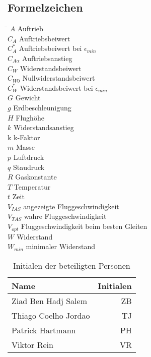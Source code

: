 \subsection*{Formelzeichen}
\begin{tabbing}
\hspace*{2cm}\=\kill
$A$ \> Auftrieb \\[0.2ex]
$C_A$ \> Auftriebsbeiwert \\[0.2ex]
$C_A^*$ \> Auftriebsbeiwert bei $\epsilon_{min}$ \\[0.2ex]
$C_{A \alpha}$ \> Auftriebsanstieg \\[0.2ex]
$C_W$ \> Widerstandsbeiwert \\[0.2ex]
$C_{W0}$ \> Nullwiderstandsbeiwert \\[0.2ex]
$C_W^*$ \> Widerstandsbeiwert bei $\epsilon_{min}$ \\[0.2ex]
$G$ \> Gewicht \\[0.2ex]
$g$ \> Erdbeschleunigung \\[0.2ex]
$H$ \> Flughöhe \\[0.2ex]
$k$ \> Widerstandsanstieg \\[0.2ex]
$\mathrm{k}$ \> k-Faktor \\[0.2ex]
$m$ \> Masse \\[0.2ex]
$p$ \> Luftdruck \\[0.2ex]
$q$ \> Staudruck \\[0.2ex]
$R$ \> Gaskonstante \\[0.2ex]
$T$ \> Temperatur \\[0.2ex]
$t$ \> Zeit \\[0.2ex]
$V_{IAS}$ \> angezeigte Fluggeschwindigkeit \\[0.2ex]
$V_{TAS}$ \> wahre Fluggeschwindigkeit \\[0.2ex]
$V_{opt}$ \> Fluggeschwindigkeit beim besten Gleiten \\[0.2ex]
$W$ \> Widerstand \\[0.2ex]
$W_{min}$ \> minimaler Widerstand \\[0.2ex]
\end{tabbing}


\begin{table}[h] 
	\centering 
	\begin{tabular}{lr} 
		
		Name & \hspace{0.5cm} Initialen\\ 
		\hline 
		Ziad Ben Hadj Salem & ZB\\
		Thiago Coelho Jordao & TJ\\
		Patrick Hartmann & PH\\
		Viktor Rein & VR\\
		\hline
		
	\end{tabular} 
	\caption{Initialen der beteiligten Personen} 
	\label{tab:initialien} 
\end{table} 
